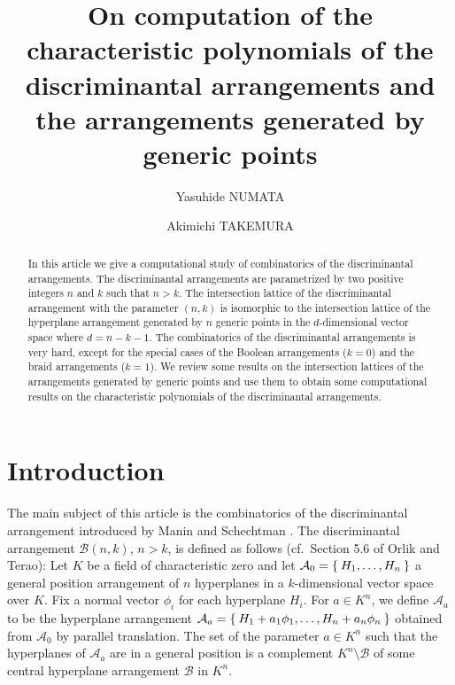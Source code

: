 \documentclass{wstmp}
\begin{document}
\title{On computation of the characteristic polynomials of the discriminantal arrangements and the arrangements generated by generic points} 

\author{Yasuhide NUMATA}
\address{Mathematical Informatics, 
Graduate School of Information Science and Technology, 
University of Tokyo.\\
JST CREST.}

\author{Akimichi TAKEMURA}
\address{Mathematical Informatics, 
Graduate School of Information Science and Technology, 
University of Tokyo.\\
JST CREST.}

\begin{abstract}
In this article we give a computational study of combinatorics of the discriminantal arrangements. The discriminantal arrangements are parametrized by two positive integers $n$ and $k$ such that $n>k$.
The intersection lattice of the discriminantal arrangement with the parameter $(n,k)$
is isomorphic to the intersection lattice of
the hyperplane arrangement generated by $n$ generic points in the $d$-dimensional
vector space where $d=n-k-1$. The combinatorics of the discriminantal arrangements is very hard,
except for the special cases of 
the Boolean arrangements ($k=0$) and  the braid arrangements ($k=1$).
We review some results on the intersection lattices
of the arrangements generated by generic points 
and use them to obtain some computational results
on the characteristic polynomials of the discriminantal arrangements.
\end{abstract}


\bodymatter

\section{Introduction}
\label{sec:intro}
The main subject of this article is the combinatorics 
of the discriminantal arrangement
introduced by Manin and Schechtman \cite{manin-schechtman1989}. 
The discriminantal arrangement 
${\mathcal{B}}(n,k)$, $n>k$, 
is defined as follows (cf.\ Section 5.6 of Orlik and Terao\cite{orlik-terao-book}):
Let $K$ be a field of characteristic zero
and 
let 
${\mathcal{A}}_0=\Set{H_1,\ldots,H_{n}}$
a general position arrangement of $n$ hyperplanes
in a $k$-dimensional vector space over $K$.
Fix a normal vector $\phi_i$ for each hyperplane $H_i$.
For $a \in K^n$, 
we define ${\mathcal{A}}_{a}$  to be the hyperplane arrangement 
${\mathcal{A}}_{a}=\Set{H_1+a_1 \phi_1,\ldots,H_{n}+a_{n}\phi_{n}}$
obtained from ${\mathcal{A}}_0$ by parallel translation.
The set
of the parameter $a\in K^n$ 
such that the hyperplanes of ${\mathcal{A}}_{a}$ are in a general position
is a complement  
$K^{n}\setminus {\mathcal{B}}$ of some central hyperplane
arrangement ${\mathcal{B}}$ in $K^{n}$. 
\end{document}
